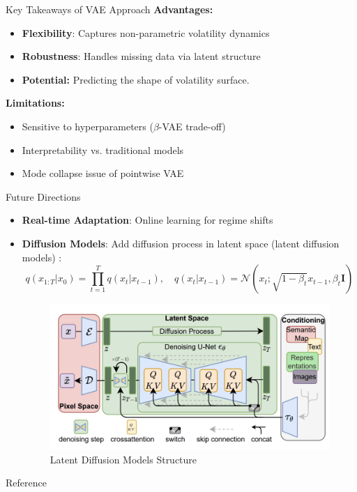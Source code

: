 \documentclass{beamer}
\begin{document}
\begin{frame}{Key Takeaways of VAE Approach}
\textbf{Advantages:}
\begin{itemize}
    \item \textbf{Flexibility}: Captures non-parametric volatility dynamics
    
    \item \textbf{Robustness}: Handles missing data via latent structure

    \item \textbf{Potential:} Predicting the shape of volatility surface.
\end{itemize}
\vspace{0.5cm}
\textbf{Limitations:}
\begin{itemize}
    \item Sensitive to hyperparameters (\(\beta\)-VAE trade-off)
    \item Interpretability vs. traditional models
    \item Mode collapse issue of pointwise VAE
\end{itemize}
\end{frame}

\begin{frame}{Future Directions}
\begin{itemize}
\item \textbf{Real-time Adaptation}: Online learning for regime shifts
    \item \textbf{Diffusion Models}: Add diffusion process in latent space (latent diffusion models) :
    \[
    q(x_{1:T}|x_0) = \prod_{t=1}^T q(x_t|x_{t-1}), \quad q(x_t|x_{t-1}) = \mathcal{N}(x_t; \sqrt{1-\beta_t}x_{t-1}, \beta_t \mathbf{I})
    \]
\begin{figure}
    \centering
    \includegraphics[width=0.6\linewidth]{docs/proposal/img/ldm.png}
    \caption{Latent Diffusion Models Structure}
    \label{fig:enter-label}
\end{figure}
\end{itemize}



\end{frame}

\begin{frame}{Reference}
    
    
\end{frame}
\end{document}
